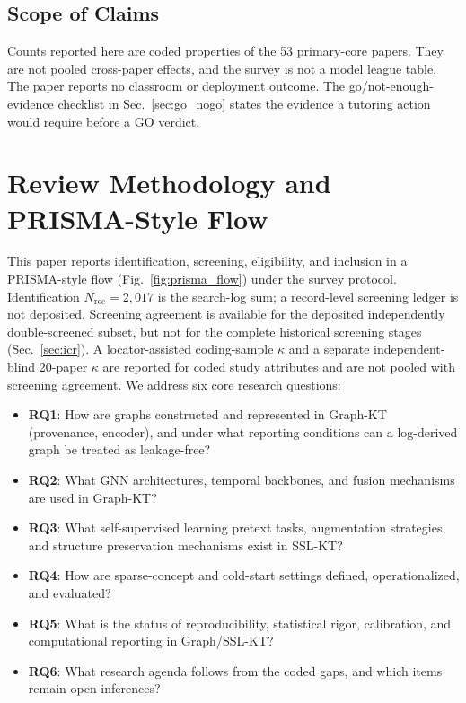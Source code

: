 \documentclass[lettersize,journal]{IEEEtran}
\begin{document}
\subsection{Scope of Claims}
\label{sec:scope_claims}
Counts reported here are coded properties of the 53 primary-core papers. They are not pooled cross-paper effects, and the survey is not a model league table. The paper reports no classroom or deployment outcome. The go/not-enough-evidence checklist in Sec.~\ref{sec:go_nogo} states the evidence a tutoring action would require before a GO verdict.

\section{Review Methodology and PRISMA-Style Flow}
\label{sec:methodology}
This paper reports identification, screening, eligibility, and inclusion in a PRISMA-style flow (Fig.~\ref{fig:prisma_flow}) under the survey protocol. Identification $N_{\mathrm{rec}}=2{,}017$ is the search-log sum; a record-level screening ledger is not deposited. Screening agreement is available for the deposited independently double-screened subset, but not for the complete historical screening stages (Sec.~\ref{sec:icr}). A locator-assisted coding-sample $\kappa$ and a separate independent-blind 20-paper $\kappa$ are reported for coded study attributes and are not pooled with screening agreement.
We address six core research questions:
\begin{itemize}
    \item \textbf{RQ1}: How are graphs constructed and represented in Graph-KT (provenance, encoder), and under what reporting conditions can a log-derived graph be treated as leakage-free?
    \item \textbf{RQ2}: What GNN architectures, temporal backbones, and fusion mechanisms are used in Graph-KT?
    \item \textbf{RQ3}: What self-supervised learning pretext tasks, augmentation strategies, and structure preservation mechanisms exist in SSL-KT?
    \item \textbf{RQ4}: How are sparse-concept and cold-start settings defined, operationalized, and evaluated?
    \item \textbf{RQ5}: What is the status of reproducibility, statistical rigor, calibration, and computational reporting in Graph/SSL-KT?
    \item \textbf{RQ6}: What research agenda follows from the coded gaps, and which items remain open inferences?
\end{itemize}
\end{document}
